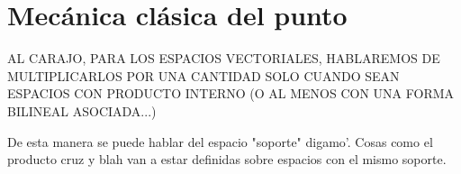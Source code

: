 \documentclass{article}
\begin{document}
\pagebreak

\section{Mecánica clásica del punto}

AL CARAJO, PARA LOS ESPACIOS VECTORIALES, HABLAREMOS DE MULTIPLICARLOS POR UNA CANTIDAD SOLO CUANDO SEAN ESPACIOS
CON PRODUCTO INTERNO (O AL MENOS CON UNA FORMA BILINEAL ASOCIADA...)

De esta manera se puede hablar del espacio "soporte" digamo'. Cosas como el producto cruz y blah van a estar
definidas sobre espacios con el mismo soporte.
\end{document}
